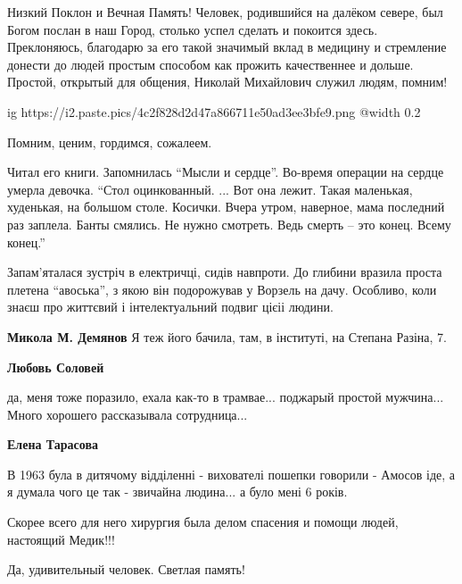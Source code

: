 \begin{itemize}
Низкий Поклон и Вечная Память! Человек, родившийся на далёком севере, был Богом
послан в наш Город, столько успел сделать и покоится здесь. Преклоняюсь, благодарю
за его такой значимый вклад в медицину и стремление донести до людей простым
способом как прожить качественнее и дольше. Простой, открытый для общения, Николай
Михайлович служил людям, помним!


\ifcmt
  ig https://i2.paste.pics/4c2f828d2d47a866711e50ad3ee3bfe9.png
  @width 0.2
\fi

Помним, ценим, гордимся, сожалеем.


Читал его книги. Запомнилась \enquote{Мысли и сердце}. Во-время операции на сердце
умерла девочка. \enquote{Стол оцинкованный. ... Вот она лежит. Такая маленькая,
худенькая, на большом столе. Косички. Вчера утром, наверное, мама последний раз
заплела. Банты смялись. Не нужно смотреть. Ведь смерть – это конец. Всему
конец.}



Запам'яталася зустріч в електричці, сидів навпроти. До глибини вразила проста
плетена \enquote{авоська}, з якою він подорожував у Ворзель на дачу. Особливо, коли
знаєш про життєвий і інтелектуальний подвиг цієіі людини.

\begin{itemize} %
\textbf{Микола М. Демянов} Я теж його бачила, там, в інституті, на Степана Разіна, 7.

\textbf{Любовь Соловей} 

да, меня тоже поразило, ехала как-то в трамвае... поджарый простой
мужчина... Много хорошего рассказывала сотрудница...

\textbf{Елена Тарасова} 

В 1963 була в дитячому відділенні - вихователі пошепки говорили - Амосов іде, а
я думала чого це так - звичайна людина... а було мені 6 років.

\end{itemize} %


Скорее всего для него хирургия была делом спасения и помощи людей, настоящий
Медик!!!

Да, удивительный человек. Светлая память!



\end{itemize}
